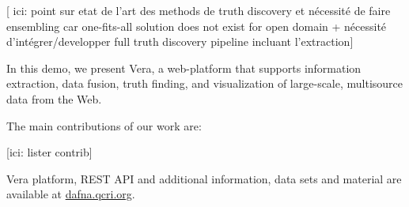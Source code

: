  [ ici: point sur etat de l'art des methods de truth discovery et nécessité de faire ensembling car one-fits-all solution does not exist for open  domain + nécessité d'intégrer/developper full truth discovery pipeline incluant l'extraction]
 
In this demo, we present {\scschape Vera}, a web-platform that supports information extraction, data fusion, truth finding, and visualization of large-scale, multisource data from the Web.

The main contributions of our work are:

 [ici: lister contrib]
 
 
{\scschape Vera} platform, REST API and additional information, data sets and material are available at \url{dafna.qcri.org}.


 
